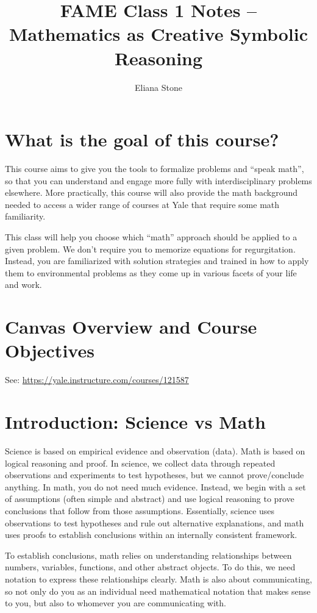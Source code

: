 \documentclass[12pt]{article}
\title{FAME Class 1 Notes -- Mathematics as Creative Symbolic Reasoning}
\author{Eliana Stone}
\begin{document}
\maketitle
\section{What is the goal of this course?}
This course aims to give you the tools to formalize problems and ``speak math'', so that you can understand and engage more fully with interdisciplinary problems elsewhere. More practically, this course will also provide the math background needed to access a wider range of courses at Yale that require some math familiarity. 

This class will help you choose which ``math'' approach should be applied to a given problem. We don't require you to memorize equations for regurgitation. Instead, you are familiarized with solution strategies and trained in how to apply them to environmental problems as they come up in various facets of your life and work.

\section{Canvas Overview and Course Objectives}

See: \hyperlink{Canvas}{https://yale.instructure.com/courses/121587}

\section{Introduction: Science vs Math}
Science is based on empirical evidence and observation (data). Math is based on logical reasoning and proof. In science, we collect data through repeated observations and experiments to test hypotheses, but we cannot prove/conclude anything. In math, you do not need much evidence. Instead, we begin with a set of assumptions (often simple and abstract) and use logical reasoning to prove conclusions that follow from those assumptions. Essentially, science uses observations to test hypotheses and rule out alternative explanations, and math uses proofs to establish conclusions within an internally consistent framework.

To establish conclusions, math relies on understanding relationships between numbers, variables, functions, and other abstract objects. To do this, we need notation to express these relationships clearly. Math is also about communicating, so not only do you as an individual need mathematical notation that makes sense to you, but also to whomever you are communicating with.
\end{document}
